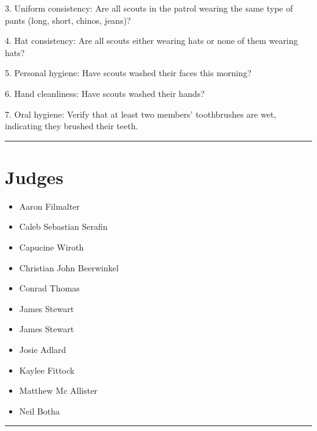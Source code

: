 \documentclass[10pt]{article}
\begin{document}
3. Uniform consistency: Are all scouts in the patrol wearing the same type of pants (long, short, chinos, jeans)?

4. Hat consistency: Are all scouts either wearing hats or none of them wearing hats?

5. Personal hygiene: Have scouts washed their faces this morning?

6. Hand cleanliness: Have scouts washed their hands?

7. Oral hygiene: Verify that at least two members' toothbrushes are wet, indicating they brushed their teeth.
\vspace{0.5cm}
	\hrule
	\vspace{0.5cm}
		\section*{\faUsers \: Judges}

		

	\begin{multicols}{2}

		\begin{itemize}
									\item Aaron Filmalter
									\item Caleb Sebastian Serafin
									\item Capucine Wiroth
									\item Christian John Beerwinkel
									\item Conrad Thomas
									\item James Stewart
						\end{itemize}

		\vfill\null
		\columnbreak

		\begin{itemize}
									\item James Stewart
									\item Josie Adlard
									\item Kaylee Fittock
									\item Matthew Mc Allister
									\item Neil Botha
						\end{itemize}

		\vfill\null

		\end{multicols}



			\vspace{0.5cm}
	\hrule
	\vspace{0.5cm}
\end{document}

